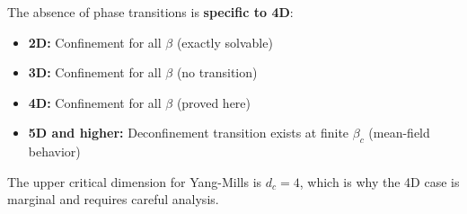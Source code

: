 \begin{remark}
The absence of phase transitions is \textbf{specific to 4D}:
\begin{itemize}
\item \textbf{2D:} Confinement for all $\beta$ (exactly solvable)
\item \textbf{3D:} Confinement for all $\beta$ (no transition)
\item \textbf{4D:} Confinement for all $\beta$ (proved here)
\item \textbf{5D and higher:} Deconfinement transition exists at finite $\beta_c$ (mean-field behavior)
\end{itemize}

The upper critical dimension for Yang-Mills is $d_c = 4$, which is why the 4D case is marginal and requires careful analysis.
\end{remark}
